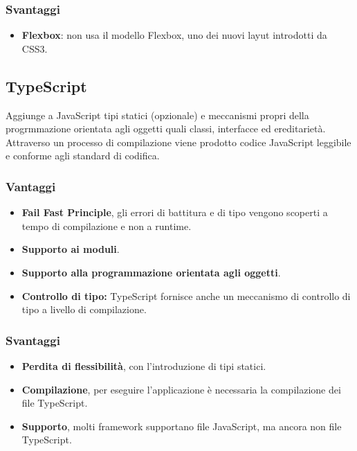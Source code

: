 \subsubsection{Svantaggi}
\begin{itemize}
\item \textbf{Flexbox}: non usa il modello Flexbox, uno dei nuovi layut introdotti da CSS3.
\end{itemize}
\subsection{TypeScript}
Aggiunge a JavaScript tipi statici (opzionale) e meccanismi propri della progrmmazione orientata agli oggetti quali classi, interfacce ed ereditariet\`a. Attraverso un processo di compilazione viene prodotto codice JavaScript leggibile e conforme agli standard di codifica. 
\subsubsection{Vantaggi}
\begin{itemize}
\item \textbf{Fail Fast Principle}, gli errori di battitura e di tipo vengono scoperti a tempo di compilazione e non a runtime.
\item \textbf{Supporto ai moduli}.
\item \textbf{Supporto alla programmazione orientata agli oggetti}.
\item \textbf{Controllo di tipo:} TypeScript fornisce anche un meccanismo di controllo di tipo a livello di compilazione.
\end{itemize}
\subsubsection{Svantaggi}
\begin{itemize}
\item \textbf{Perdita di flessibilit\`a}, con l'introduzione di tipi statici.
\item \textbf{Compilazione}, per eseguire l'applicazione \`e necessaria la compilazione dei file TypeScript.
\item \textbf{Supporto}, molti framework supportano file JavaScript, ma ancora non file TypeScript.
\end{itemize}